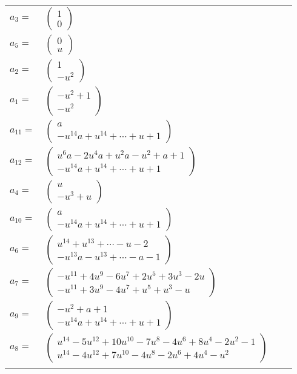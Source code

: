 \documentclass[1p]{elsarticle_modified}
\theoremstyle{definition}
\begin{document}
\begin{tabular}{m{7pt} m{180pt} m{7pt} m{180pt} }
\flushright $a_{3}=$&$\begin{pmatrix}1\\0\end{pmatrix}$ \\
\flushright $a_{5}=$&$\begin{pmatrix}0\\u\end{pmatrix}$ \\
\flushright $a_{2}=$&$\begin{pmatrix}1\\- u^2\end{pmatrix}$ \\
\flushright $a_{1}=$&$\begin{pmatrix}- u^2+1\\- u^2\end{pmatrix}$ \\
\flushright $a_{11}=$&$\begin{pmatrix}a\\- u^{14} a+u^{14}+\cdots+u+1\end{pmatrix}$ \\
\flushright $a_{12}=$&$\begin{pmatrix}u^6 a-2 u^4 a+u^2 a- u^2+a+1\\- u^{14} a+u^{14}+\cdots+u+1\end{pmatrix}$ \\
\flushright $a_{4}=$&$\begin{pmatrix}u\\- u^3+u\end{pmatrix}$ \\
\flushright $a_{10}=$&$\begin{pmatrix}a\\- u^{14} a+u^{14}+\cdots+u+1\end{pmatrix}$ \\
\flushright $a_{6}=$&$\begin{pmatrix}u^{14}+u^{13}+\cdots- u-2\\- u^{13} a- u^{13}+\cdots- a-1\end{pmatrix}$ \\
\flushright $a_{7}=$&$\begin{pmatrix}- u^{11}+4 u^9-6 u^7+2 u^5+3 u^3-2 u\\- u^{11}+3 u^9-4 u^7+u^5+u^3- u\end{pmatrix}$ \\
\flushright $a_{9}=$&$\begin{pmatrix}- u^2+a+1\\- u^{14} a+u^{14}+\cdots+u+1\end{pmatrix}$ \\
\flushright $a_{8}=$&$\begin{pmatrix}u^{14}-5 u^{12}+10 u^{10}-7 u^8-4 u^6+8 u^4-2 u^2-1\\u^{14}-4 u^{12}+7 u^{10}-4 u^8-2 u^6+4 u^4- u^2\end{pmatrix}$\\&\end{tabular}
\end{document}

